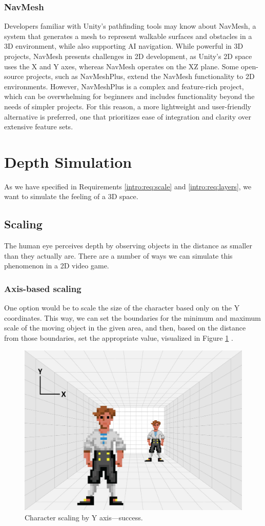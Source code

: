 \subsubsection{NavMesh}
Developers familiar with Unity’s pathfinding tools may know about NavMesh, a system that generates a mesh to represent walkable surfaces and obstacles in a 3D environment, while also supporting AI navigation. While powerful in 3D projects, NavMesh presents challenges in 2D development, as Unity's 2D space uses the X and Y axes, whereas NavMesh operates on the XZ plane. Some open-source projects, such as NavMeshPlus, extend the NavMesh functionality to 2D environments. However, NavMeshPlus is a complex and feature-rich project, which can be overwhelming for beginners and includes functionality beyond the needs of simpler projects. For this reason, a more lightweight and user-friendly alternative is preferred, one that prioritizes ease of integration and clarity over extensive feature sets. 

\section{Depth Simulation}
As we have specified in Requirements \ref{intro:req:scale} and \ref{intro:req:layers}, we want to simulate the feeling of a 3D space. 

\subsection{Scaling}
\label{analysis:depth:scaling}
The human eye perceives depth by observing objects in the distance as smaller than they actually are. There are a number of ways we can simulate this phenomenon in a 2D video game. 

\subsubsection{Axis-based scaling}
One option would be to scale the size of the character based only on the Y coordinates. This way, we can set the boundaries for the minimum and maximum scale of the moving object in the given area, and then, based on the distance from those boundaries, set the appropriate value, visualized in Figure \ref{fig:Room} . 

\begin{figure}[H]
\centering
\includegraphics[width=.6\linewidth]{img/room2.png}
\caption{Character scaling by Y axis—success.}
\label{fig:Room}
\end{figure}

